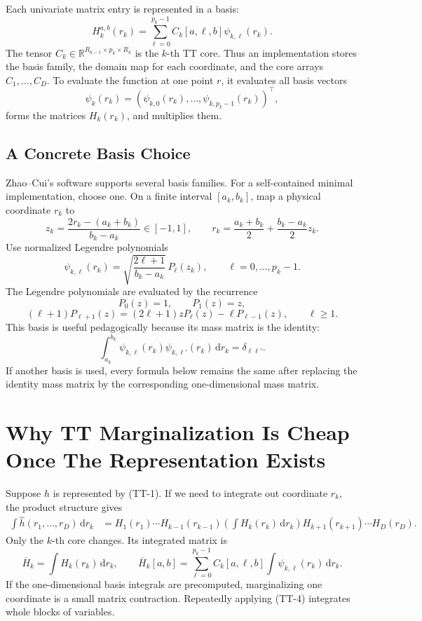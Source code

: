 \documentclass[11pt]{article}
\newcommand{\R}{\mathbb R}
\newcommand{\dd}{\,\mathrm d}
\begin{document}
Each univariate matrix entry is represented in a basis:
\[
    H_k^{a,b}(r_k)
    =
    \sum_{\ell=0}^{p_k-1}
    C_k[a,\ell,b]\psi_{k,\ell}(r_k).
    \tag{TT-3}
\]
The tensor \(C_k\in\R^{R_{k-1}\times p_k\times R_k}\) is the \(k\)-th TT core.
Thus an implementation stores the basis family, the domain map for each
coordinate, and the core arrays \(C_1,\ldots,C_D\).  To evaluate the function at
one point \(r\), it evaluates all basis vectors
\[
    \psi_k(r_k)
    =
    (\psi_{k,0}(r_k),\ldots,\psi_{k,p_k-1}(r_k))^\top,
\]
forms the matrices \(H_k(r_k)\), and multiplies them.

\subsection{A Concrete Basis Choice}

Zhao--Cui's software supports several basis families.  For a self-contained
minimal implementation, choose one.  On a finite interval
\([a_k,b_k]\), map a physical coordinate \(r_k\) to
\[
    z_k=\frac{2r_k-(a_k+b_k)}{b_k-a_k}\in[-1,1],
    \qquad
    r_k=\frac{a_k+b_k}{2}+\frac{b_k-a_k}{2}z_k.
    \tag{TT-6}
\]
Use normalized Legendre polynomials
\[
    \psi_{k,\ell}(r_k)
    =
    \sqrt{\frac{2\ell+1}{b_k-a_k}}\,
    P_\ell(z_k),
    \qquad \ell=0,\ldots,p_k-1.
    \tag{TT-7}
\]
The Legendre polynomials are evaluated by the recurrence
\[
    P_0(z)=1,\qquad P_1(z)=z,
\]
\[
    (\ell+1)P_{\ell+1}(z)
    =
    (2\ell+1)zP_\ell(z)-\ell P_{\ell-1}(z),
    \qquad \ell\ge1.
    \tag{TT-8}
\]
This basis is useful pedagogically because its mass matrix is the identity:
\[
    \int_{a_k}^{b_k}\psi_{k,\ell}(r_k)\psi_{k,\ell'}(r_k)\dd r_k
    =
    \delta_{\ell\ell'}.
    \tag{TT-9}
\]
If another basis is used, every formula below remains the same after replacing
the identity mass matrix by the corresponding one-dimensional mass matrix.

\section{Why TT Marginalization Is Cheap Once The Representation Exists}

Suppose \(h\) is represented by (TT-1).  If we need to integrate out coordinate
\(r_k\), the product structure gives
\[
\begin{aligned}
 \int \widehat h(r_1,\ldots,r_D)\dd r_k
 &=
 H_1(r_1)\cdots H_{k-1}(r_{k-1})
 \left(\int H_k(r_k)\dd r_k\right)
 H_{k+1}(r_{k+1})\cdots H_D(r_D).
\end{aligned}
\tag{TT-4}
\]
Only the \(k\)-th core changes.  Its integrated matrix is
\[
    \overline H_k
    =
    \int H_k(r_k)\dd r_k,\qquad
    \overline H_k[a,b]
    =
    \sum_{\ell=0}^{p_k-1} C_k[a,\ell,b]
    \int \psi_{k,\ell}(r_k)\dd r_k.
    \tag{TT-5}
\]
If the one-dimensional basis integrals are precomputed, marginalizing one
coordinate is a small matrix contraction.  Repeatedly applying (TT-4) integrates
whole blocks of variables.
\end{document}

